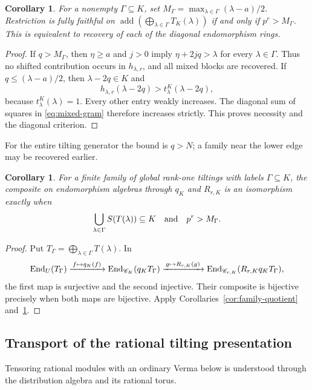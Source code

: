 \documentclass[11pt,reqno]{amsart}
\newcommand{\add}{\operatorname{add}}\newcommand{\im}{\operatorname{im}}\newcommand{\coker}{\operatorname{coker}}\newcommand{\rad}{\operatorname{rad}}
\newtheorem{corollary}[theorem]{Corollary}
\theoremstyle{definition}
\theoremstyle{remark}
\numberwithin{equation}{section}
\begin{document}
\begin{corollary}\label{cor:sharp-family}
For a nonempty $\Gamma\subseteq K$, set
$M_\Gamma=\max_{\lambda\in\Gamma}(\lambda-a)/2$. Restriction is fully
faithful on $\add(\bigoplus_{\lambda\in\Gamma}T_K(\lambda))$ if and
only if $p^r>M_\Gamma$. This is equivalent to recovery of each of
the diagonal endomorphism rings.
\end{corollary}
\begin{proof}
If $q>M_\Gamma$, then $\eta\geq a$ and $j>0$ imply
$\eta+2jq>\lambda$ for every $\lambda\in\Gamma$. Thus no shifted
contribution occurs in $h_{\lambda,r}$, and all mixed blocks
are recovered. If $q\leq(\lambda-a)/2$, then $\lambda-2q\in K$ and
\[
 h_{\lambda,r}(\lambda-2q)>t^K_\lambda(\lambda-2q),
\]
because $t^K_\lambda(\lambda)=1$. Every other entry weakly
increases. The diagonal sum of squares in \eqref{eq:mixed-gram}
therefore increases strictly. This proves necessity and the diagonal
criterion.
\end{proof}

For the entire tilting generator the bound is $q>N$; a family near
the lower edge may be recovered earlier.

\begin{corollary}\label{cor:composite-family}
For a finite family of global rank-one tiltings with labels
$\Gamma\subseteq K$, the composite on endomorphism algebras through
$q_K$ and $R_{r,K}$ is an isomorphism exactly when
\[
 \bigcup_{\lambda\in\Gamma}S(T(\lambda))\subseteq K
 \quad\hbox{and}\quad p^r>M_\Gamma.
\]
\end{corollary}
\begin{proof}
Put $T_\Gamma=\bigoplus_{\lambda\in\Gamma}T(\lambda)$. In
\[
 \operatorname{End}_U(T_\Gamma)\xrightarrow{\,f\mapsto q_K(f)\,}
 \operatorname{End}_{\mathscr C_K}(q_KT_\Gamma)\xrightarrow{\,g\mapsto R_{r,K}(g)\,}
 \operatorname{End}_{\mathscr C_{r,K}}(R_{r,K}q_KT_\Gamma),
\]
the first map is surjective and the second injective. Their
composite is bijective precisely when both maps
are bijective. Apply Corollaries~\ref{cor:family-quotient}
and~\ref{cor:sharp-family}.
\end{proof}

\subsection{Transport of the rational tilting presentation}
Tensoring rational modules with an ordinary Verma below is
understood through the distribution algebra and its rational torus.
\end{document}
